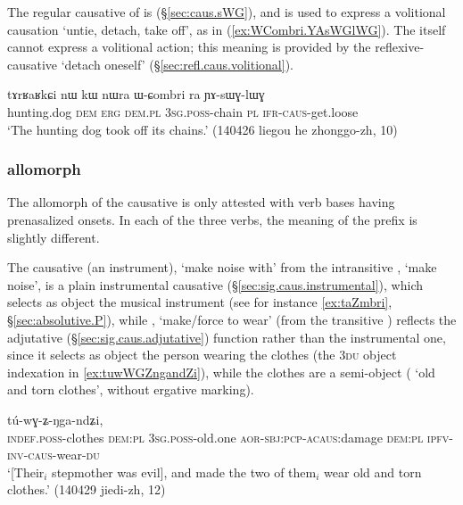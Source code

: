 The regular causative of  is  (§\ref{sec:caus.sWG}), and is used to express a volitional causation `untie, detach, take off', as in (\ref{ex:WCombri.YAsWGlWG}). The  itself cannot express a volitional action; this meaning is provided by the reflexive-causative  `detach oneself' (§\ref{sec:refl.caus.volitional}).

\begin{exe}
\ex \label{ex:WCombri.YAsWGlWG}
\gll tɤrʁaʁkɕi nɯ kɯ nɯra ɯ-ɕombri ra ɲɤ-sɯɣ-lɯɣ \\
hunting.dog \textsc{dem} \textsc{erg} \textsc{dem}.\textsc{pl} \textsc{3sg}.\textsc{poss}-chain \textsc{pl} \textsc{ifr}-\textsc{caus}-get.loose \\
\glt `The hunting dog took off its chains.' (140426 liegou he zhonggo-zh, 10)
\end{exe}


\subsubsection{ allomorph} \label{sec:caus.Z}
The  allomorph of the causative is only attested with verb bases having prenasalized onsets. In each of the three verbs, the meaning of the prefix is slightly different.
 
The causative  (an instrument), `make noise with' from the intransitive , `make noise', is a plain instrumental causative (§\ref{sec:sig.caus.instrumental}), which selects as object the musical instrument (see for instance \ref{ex:taZmbri}, §\ref{sec:absolutive.P}), while , `make/force to wear'  (from the transitive ) reflects the  adjutative  (§\ref{sec:sig.caus.adjutative}) function rather than the instrumental one, since it selects as object the person wearing the clothes (the \textsc{3du} object indexation in \ref{ex:tuwWGZngandZi}), while the clothes are a semi-object ( `old and torn clothes', without ergative marking).

\begin{exe}
\ex \label{ex:tuwWGZngandZi}
 tú-wɣ-ʑ-ŋga-ndʑi, \\
\textsc{indef}.\textsc{poss}-clothes \textsc{dem}:\textsc{pl} \textsc{3sg}.\textsc{poss}-old.one \textsc{aor}-\textsc{sbj}:\textsc{pcp}-\textsc{acaus}:damage \textsc{dem}:\textsc{pl} \textsc{ipfv}-\textsc{inv}-\textsc{caus}-wear-\textsc{du} \\
\glt `[Their$_i$ stepmother was evil], and made the two of them$_i$ wear old and torn clothes.' (140429 jiedi-zh, 12)
\end{exe}

